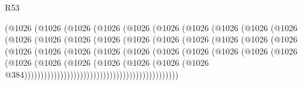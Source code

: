\begin{lexlean}{R53}
\begin{coremodule}
                        (@1026
                          (@1026
                            (@1026
                              (@1026
                                (@1026
                                  (@1026
                                    (@1026
                                      (@1026
                                        (@1026
                                          (@1026
                                            (@1026
                                              (@1026
                                                (@1026
                                                  (@1026
                                                    (@1026
                                                      (@1026
                                                        (@1026
                                                          (@1026
                                                            (@1026
                                                              (@1026
                                                                (@1026
                                                                  (@1026
                                                                    (@1026
                                                                      (@1026
                                                                        (@1026
                                                                          (@1026
                                                                            (@1026
                                                                              (@1026
                                                                                (@1026
                                                                                  (@1026
                                                                                    (@1026
                                                                                      (@1026
                                                                                        (@1026
                                                                                          (@1026
                                                                                            (@1026
                                                                                              (@1026
                                                                                                (@1026
                                                                                                  @384)))))))))))))))))))))))))))))))))))))))))))))))

\end{coremodule}
\end{lexlean}
